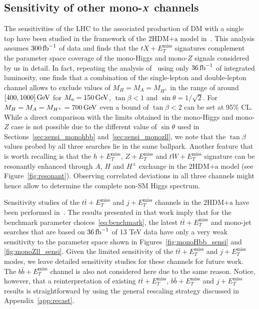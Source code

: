 \documentclass[a4paper, 11pt,notoc]{article}
\newcommand{\MET}{\ensuremath{E_T^\mathrm{miss}}\xspace}
\newcommand{\ma}{\ensuremath{M_{a}}\xspace}
\newcommand{\mHc}{\ensuremath{M_{H^{\pm}}}\xspace}
\newcommand{\hdma}{\ensuremath{\textrm{2HDM+a}}\xspace}
\def\bm#1{\mbox{\boldmath$#1$\unboldmath}}
\begin{document}
\subsection[Sensitivity of other mono-$X$ channels]{Sensitivity of other mono-$\bm{X}$ channels}
\label{sec:sensi_others}

The sensitivities of the LHC to the associated production of DM with a single top have been  studied in the framework of the \hdma model in~\cite{Pani:2017qyd}. This analysis assumes $300 \, {\rm fb}^{-1}$ of data and finds that the $t X + \MET$ signatures complement the parameter space coverage of the mono-Higgs and  mono-$Z$ signals considered by us in detail.   In fact, repeating  the analysis of~\cite{Pani:2017qyd} using only   $36 \, {\rm fb}^{-1}$ of integrated luminosity, one finds that a combination of the single-lepton and double-lepton channel allows to exclude values of $M_H = M_A = \mHc$ in the range of around $[400, 1000 ] \, {\rm GeV}$ for $\ma = 150 \, {\rm GeV}$, $\tan \beta < 1$ and $\sin \theta = 1/\sqrt{2}$. For $M_H = M_A = \mHc = 700 \, {\rm GeV}$ even a bound of $\tan \beta < 2$ can be set at 95\% CL. While a direct comparison with the limits obtained in the mono-Higgs and mono-$Z$ case is not possible due to the different value of $\sin \theta$ used in Sections~\ref{sec:sensi_monohbb} and~\ref{sec:sensi_monozll},  we note that the $\tan \beta$ values probed by all three searches  lie in the same ballpark. Another feature that is worth recalling is that the $h+\MET$, $Z+\MET$ and $tW+\MET$ signature can be resonantly enhanced through $A$, $H$ and $H^\pm$ exchange in the \hdma model (see Figure~\ref{fig:resonant}). Observing correlated deviations in all three channels might hence allow to determine the complete non-SM Higgs spectrum. 

Sensitivity studies of the $t \bar t + \MET$ and $j + \MET$ channels in the \hdma have been performed in~\cite{Bauer:2017ota}. The results presented in that work imply that for the benchmark parameter choices~\eqref{eq:benchmark}, the latest  $t \bar t + \MET$ and  mono-jet searches that are based on $36 \, {\rm fb}^{-1}$ of 13 TeV data have  only a very weak sensitivity to the parameter space shown in Figures~\ref{fig:monoHbb_sensi} and \ref{fig:monoZll_sensi}. Given the limited sensitivity of the $t \bar t + \MET$ and $j + \MET$  modes, we leave detailed sensitivity studies for
   these channels for future work. The $b \bar b + \MET$ channel is also not considered here due to the same reason. Notice, however, that a reinterpretation of existing $t \bar t + \MET$, $b \bar b + \MET$ and $j + \MET$ results is straightforward by using the general rescaling strategy discussed in Appendix~\ref{app:recast}. 
\end{document}

